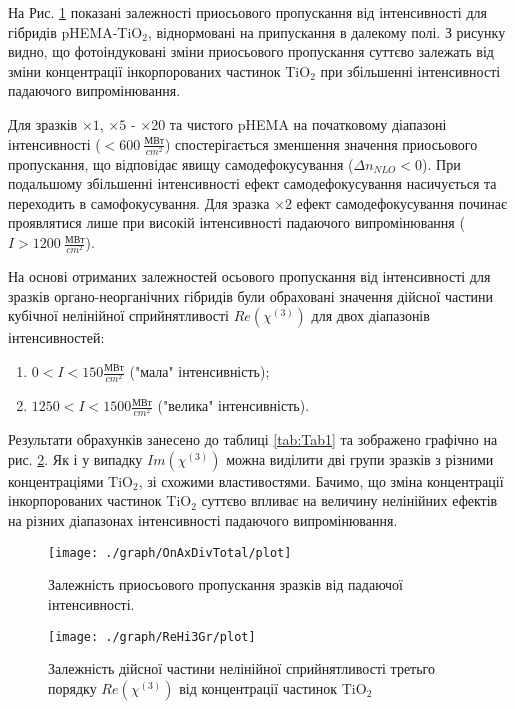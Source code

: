 На Рис. \ref{fig:OnAxDivTot} показані залежності приосьового пропускання від інтенсивності для гібридів pHEMA-TiO$_2$, віднормовані на припускання в далекому полі. З рисунку видно, що фотоіндуковані зміни приосьового пропускання суттєво залежать від зміни концентрації інкорпорованих частинок TiO$_2$ при збільшенні інтенсивності падаючого випромінювання.

Для зразків $\times1$, $\times5$ - $\times20$ та чистого pHEMA на початковому діапазоні інтенсивності ($<600~ \frac{\textbf{МВт}}{cm^2}$) спостерігається зменшення значення приосьового пропускання, що відповідає явищу самодефокусування ($\Delta n_{NLO} < 0$). При подальшому збільшенні інтенсивності ефект самодефокусування насичується та переходить в самофокусування. Для зразка $\times2$ ефект самодефокусування починає проявлятися лише при високій інтенсивності падаючого випромінювання ($I>1200 ~\frac{\textbf{МВт}}{cm^2}$). 
 
На основі отриманих залежностей осьового пропускання від інтенсивності для
зразків органо-неорганічних гібридів були обраховані значення дійсної частини кубічної нелінійної сприйнятливості $Re(\chi^{(3)})$ для двох діапазонів інтенсивностей:
\begin{enumerate}
\item $0 < I <150 \frac{\textbf{МВт}}{cm^2}$ ("мала" інтенсивність);
\item $1250 < I <1500 \frac{\textbf{МВт}}{cm^2}$ ("велика" інтенсивність).
\end{enumerate}
 
Результати обрахунків занесено до таблиці \ref{tab:Tab1} та зображено графічно на рис. \ref{fig:ReHi3}. Як і у випадку $Im(\chi^{(3)})$ можна виділити дві групи зразків з різними концентраціями TiO$_2$, зі схожими властивостями. Бачимо, що зміна концентрації інкорпорованих частинок TiO$_2$ суттєво впливає на величину нелінійних ефектів на різних діапазонах інтенсивності падаючого випромінювання. 
\begin{figure}
\centering
\texttt{[image: ./graph/OnAxDivTotal/plot]}
\caption{Залежність приосьового пропускання зразків від падаючої
інтенсивності.}\label{fig:OnAxDivTot}
\end{figure}


\begin{figure}
\centering
\texttt{[image: ./graph/ReHi3Gr/plot]}
\caption{Залежність дійсної частини нелінійної сприйнятливості третьго порядку $Re(\chi^{(3)})$ від концентрації частинок TiO$_2$}\label{fig:ReHi3}
\end{figure}

